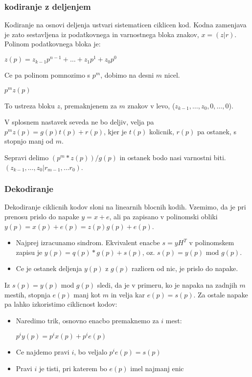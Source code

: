 \documentclass{article}
\begin{document}
\begin{multicols}{4}
\subsubsection{kodiranje z deljenjem}
Kodiranje na osnovi deljenja ustvari sistematicen ciklicen kod. Kodna zamenjava je zato sestavljena iz podatkovnega in varnostnega bloka znakov, $x = (z | r)$.
Polinom podatkovnega bloka je:
\begin{center}
    \begin{math}
        z(p) = z_{k-1}p^{n-1} + \dots + z_1p^{1} + z_0p^0
    \end{math}
\end{center}
Ce pa polinom pomnozimo s $p^m$, dobimo na desni $m$ nicel.
\begin{center}
    \begin{math}
        p^m z(p)
    \end{math}
\end{center}
To ustreza bloku $z$, premaknjenem za $m$ znakov v levo, ($z_{k-1}, \dots, z_0, 0, \dots, 0$).

V splosnem nastavek seveda ne bo deljiv, velja pa $p^mz(p) = g(p)t(p) + r(p)$, kjer je $t(p)$ kolicnik,
$r(p)$ pa ostanek, s stopnjo manj od $m$.

Sepravi delimo $(p^m *z(p)) / g(p)$ in ostanek bodo nasi varnostni biti.
$(z_{k-1}, \dots, z_0 | r_{m-1}, \dots r_0)$.

\subsubsection{Dekodiranje}
Dekodiranje ciklicnih kodov sloni na linearnih blocnih kodih. Vzemimo, da je pri prenosu prislo do napake $y = x + e$, ali pa zapisano v polinomski
obliki $y(p) = x(p) + e(p) = z(p)g(p) + e(p)$.
\begin{itemize}
    \item Najprej izracunamo sindrom. Ekvivalent enacbe $s = yH^T$ v polinomskem zapisu je $y(p) = q(p)*g(p) + s(p)$, oz. $s(p) = y(p) \text{ mod } g(p)$.
    \item Ce je ostanek deljenja $y(p)$ z $g(p)$ razlicen od nic, je prislo do napake.
\end{itemize}
Iz $s(p) = y(p) \text{ mod } g(p)$ sledi, da je v primeru, ko je napaka na zadnjih $m$ mestih, stopnja $e(p)$ manj kot $m$ in velja kar $e(p) = s(p)$.
Za ostale napake pa lahko izkoristimo ciklicnost kodov:
\begin{itemize}
    \item Naredimo trik, osnovno enacbo premaknemo za $i$ mest:
        \begin{center}
            $p^iy(p) = p^ix(p) + p^i e(p)$
        \end{center}
    \item Ce najdemo pravi $i$, bo veljalo $p^i e(p) = s(p)$
    \item Pravi $i$ je tisti, pri katerem bo $e(p)$ imel najmanj enic
\end{itemize}


\end{multicols}
\end{document}
